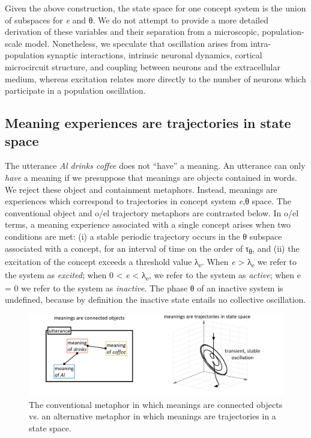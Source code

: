   Given the above construction, the state space for one concept system is the union of subspaces for \textit{e} and θ. We do not attempt to provide a more detailed derivation of these variables and their separation from a microscopic, population-scale model. Nonetheless, we speculate that oscillation arises from intra-population synaptic interactions, intrinsic neuronal dynamics, cortical microcircuit structure, and coupling between neurons and the extracellular medium, whereas excitation relates more directly to the number of neurons which participate in a population oscillation.  

\subsection{Meaning experiences are trajectories in state space}

The utterance \textit{Al drinks coffee} does not “have” a meaning. An utterance can only \textit{have} a meaning if we presuppose that meanings are objects contained in words. We reject these object and containment metaphors. Instead, meanings are experiences which correspond to trajectories in concept system \textit{e},θ space. The conventional object and o/el trajectory metaphors are contrasted below. In o/el terms, a meaning experience associated with a single concept arises when two conditions are met: (i) a stable periodic trajectory occurs in the θ subspace associated with a concept, for an interval of time on the order of τ\textsubscript{θ}, and (ii) the excitation of the concept exceeds a threshold value λ\textsubscript{e}. When \textit{e} > λ\textsubscript{e} we refer to the system as \textit{excited}; when 0 < \textit{e} < λ\textsubscript{e}, we refer to the system as \textit{active}; when e = 0 we refer to the system as \textit{inactive}. The phase θ of an inactive system is undefined, because by definition the inactive state entails no collective oscillation. 

  
\begin{figure}
\includegraphics[width=\textwidth]{figures/Tilsen-img13.png}
\caption{The conventional metaphor in which meanings are connected objects vs. an alternative metaphor in which meanings are trajectories in a state space.}
\label{fig:2:6}
\end{figure}
 

